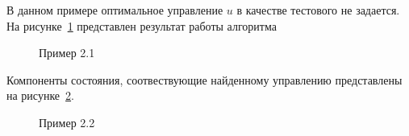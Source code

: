 В данном примере оптимальное управление $u$ в качестве тестового не задается.
На рисунке~\ref{img_test_2} представлен результат работы алгоритма

\begin{figure}[H]
    \centering
    \caption{Пример 2.1}
    \label{img_test_2}
\end{figure}

Компоненты состояния, соотвествующие найденному управлению представлены на рисунке~\ref{img_end_state}.
\begin{figure}[H]
    \centering
    \caption{Пример 2.2}
    \label{img_end_state}
\end{figure}

